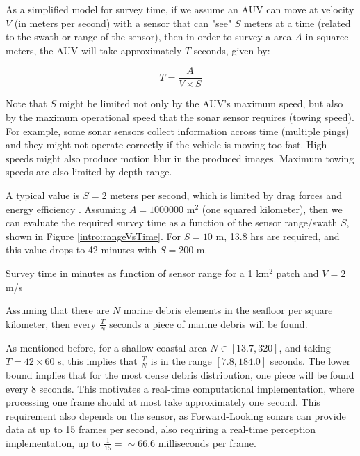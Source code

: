 As a simplified model for survey time, if we assume an AUV can move at velocity $V$ (in meters per second) with a sensor that can "see" $S$ meters at a time (related to the swath or range of the sensor), then in order to survey a area $A$ in squaree meters, the AUV will take approximately $T$ seconds, given by:

\begin{equation}
    T = \frac{A}{V \times S}
\end{equation}

Note that $S$ might be limited not only by the AUV's maximum speed, but also by the maximum operational speed that the sonar sensor requires (towing speed). For example, some sonar sensors collect information across time (multiple pings) and they might not operate correctly if the vehicle is moving too fast. High speeds might also produce motion blur in the produced images. Maximum towing speeds are also limited by depth range.

A typical value is $S = 2$ meters per second, which is limited by drag forces and energy efficiency \cite{fossen2011handbook}. Assuming $A = 1000000$ m$^2$ (one squared kilometer), then we can evaluate the required survey time as a function of the sensor range/swath $S$, shown in Figure \ref{intro:rangeVsTime}. For $S = 10$ m, 13.8 hrs are required, and this value drops to 42 minutes with $S = 200$ m.

\begin{marginfigure}
    \centering
    \caption[Survey time in minutes as function of sensor range]{Survey time in minutes as function of sensor range for a 1 km$^2$ patch and $V=2$ m/s}
    \label{intro:rangeVsTime}
\end{marginfigure}

Assuming that there are $N$ marine debris elements in the seafloor per square kilometer, then every $\frac{T}{N}$ seconds a piece of marine debris will be found.

As mentioned before, for a shallow coastal area $N \in [13.7, 320]$, and taking $T = 42 \times 60$ s, this implies that $\frac{T}{N}$ is in the range $[7.8, 184.0]$ seconds. The lower bound implies that for the most dense debris distribution, one piece will be found every $8$ seconds. This motivates a real-time computational implementation, where processing one frame should at most take approximately one second. This requirement also depends on the sensor, as Forward-Looking sonars can provide data at up to 15 frames per second, also requiring a real-time perception implementation, up to $\frac{1}{15} = \sim 66.6$ milliseconds per frame.

